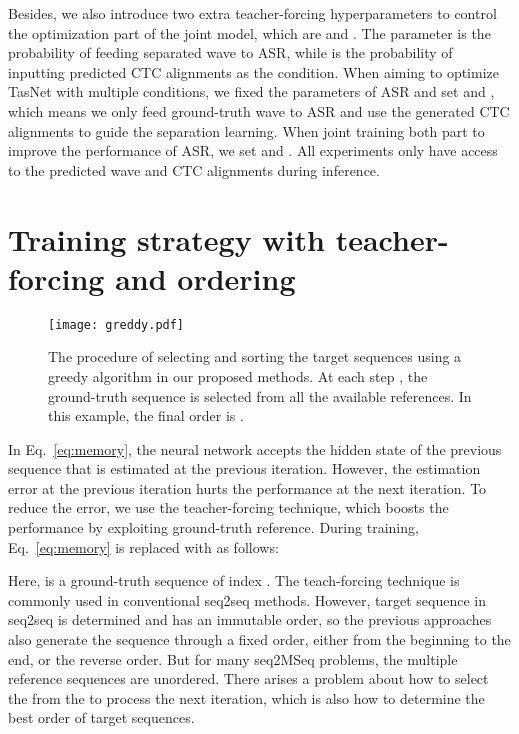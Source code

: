 \documentclass{article}
\begin{document}
Besides, we also introduce two extra teacher-forcing hyperparameters to control the optimization part of the joint model, which are  and . The parameter  is the probability of feeding separated wave to ASR, while  is the probability of inputting predicted CTC alignments as the condition. When aiming to optimize TasNet with multiple conditions, we fixed the parameters of ASR and set  and , which means we only feed ground-truth wave to ASR and use the generated CTC alignments to guide the separation learning. When joint training both part to improve the performance of ASR, we set  and . All experiments only have access to the predicted wave and CTC alignments during inference.


\section{Training strategy with teacher-forcing and ordering}\label{appendix:greddy-tf}

\begin{figure}[h]
  \centering
    \texttt{[image: greddy.pdf]}
    \caption{The procedure of selecting and sorting the target sequences using a greedy algorithm in our proposed methods. At each step , the ground-truth sequence  is selected from all the available references. In this example, the final order  is .\label{fig:greddy}}
\end{figure}

In Eq.~\ref{eq:memory}, the neural network accepts the hidden state of the previous sequence that is estimated at the previous iteration. However, the estimation error at the previous iteration hurts the performance at the next iteration. To reduce the error, we use the teacher-forcing \cite{Williams1989} technique, which boosts the performance by exploiting ground-truth reference.
During training, Eq.~\ref{eq:memory} is replaced with as follows:

Here,  is a ground-truth sequence of index .
The teach-forcing technique is commonly used in conventional seq2seq methods. However, target sequence in seq2seq is determined and has an immutable order, so the previous approaches also generate the sequence through a fixed order, either from the beginning to the end, or the reverse order.
But for many seq2MSeq problems, the multiple reference sequences are unordered. There arises a problem about how to select the  from the  to process the next iteration, which is also how to determine the best order  of target sequences. 
\end{document}
